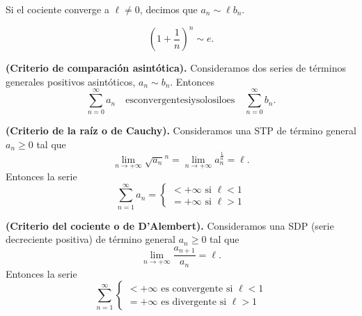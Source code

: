 {\begin{note}
    Si el cociente converge a $\ell\neq 0$, decimos que $a_n\sim \ell b_n$.
\end{note}

\begin{example}
    \begin{equation}
        \left( 1 + \frac{1}{n} \right) ^n \sim e.
    \end{equation}
\end{example}

\begin{theorem}
    \textbf{(Criterio de comparación asintótica).} Consideramos dos series de términos generales positivos asintóticos,
    $a_n\sim b_n$. Entonces
    \begin{equation}
        \sum_{n=0}^\infty a_n \quad\mathrm{es convergente si y solo si lo es}\quad \sum_{n=0}^\infty b_n.
    \end{equation}
\end{theorem}

\begin{theorem}
    \textbf{(Criterio de la raíz o de Cauchy).} Consideramos una STP de término general $a_n \geq 0$ tal que
    \begin{equation}
        \lim_{n\to+\infty} \sqrt{a_n}^n = \lim_{n\to+\infty} a_n^{\frac{1}{n}} = \ell.
    \end{equation}
    Entonces la serie
    \begin{equation}
        \sum_{n=1}^\infty a_n = \begin{cases}
            < +\infty \textrm{ si } \ell < 1 \\
            = +\infty \textrm{ si } \ell > 1
        \end{cases}
    \end{equation}
\end{theorem}

\begin{theorem}
    \textbf{(Criterio del cociente o de D'Alembert).} Consideramos una SDP (serie decreciente positiva) de término general $a_n \geq 0$ tal que
    \begin{equation}
        \lim_{n\to+\infty} \frac{a_{n + 1}}{a_n} = \ell.
    \end{equation}
    Entonces la serie
    \begin{equation}
        \sum_{n=1}^\infty \begin{cases}
            < +\infty \textrm{ es convergente si } \ell < 1 \\
            = +\infty \textrm{ es divergente si } \ell > 1
        \end{cases}
    \end{equation}
\end{theorem}

}

